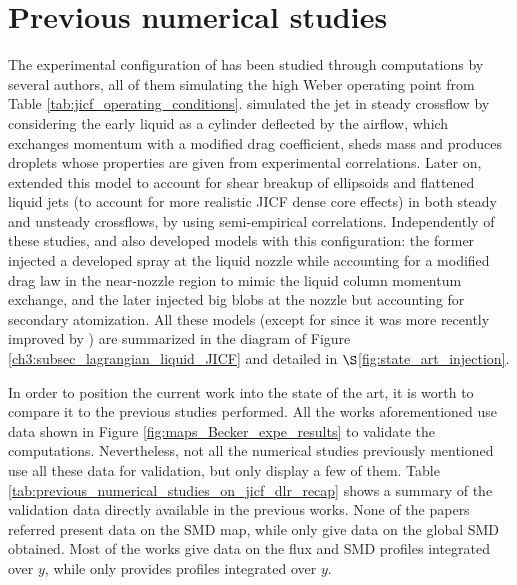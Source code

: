 \section{Previous numerical studies}
\label{ch6:previous_numerical_studies}

The experimental configuration of  has been studied through computations by several authors, all of them simulating the high Weber operating point from Table \ref{tab:jicf_operating_conditions}.  simulated the jet in steady crossflow by considering the early liquid as a cylinder deflected by the airflow, which exchanges momentum with a modified drag coefficient, sheds mass and produces droplets whose properties are given from experimental correlations. Later on,  extended this model to account for shear breakup of ellipsoids and flattened liquid jets (to account for more realistic JICF dense core effects) in both steady and unsteady crossflows, by using semi-empirical correlations. Independently of these studies,  and  also developed models with this configuration: the former injected a developed spray at the liquid nozzle while accounting for a modified drag law in the near-nozzle region to mimic the liquid column momentum exchange, and the later injected big blobs at the nozzle but accounting for secondary atomization. All these models (except for
 since it was more recently improved by ) are summarized in the diagram of Figure \ref{ch3:subsec_lagrangian_liquid_JICF} and detailed in $\S$\ref{fig:state_art_injection}.

In order to position the current work into the state of the art, it is worth to compare it to the previous studies performed. All the works aforementioned use data shown in Figure \ref{fig:maps_Becker_expe_results} to validate the computations. Nevertheless, not all the numerical studies previously mentioned use all these data for validation, but only display a few of them. Table \ref{tab:previous_numerical_studies_on_jicf_dlr_recap} shows a summary of the validation data directly available in the previous works. None of the papers referred present data on the SMD map, while only  give data on the global SMD obtained. Most of the works give data on the flux and SMD profiles integrated over $y$, while only  provides profiles integrated over $y$. %

